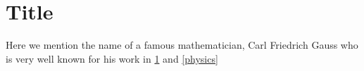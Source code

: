 \documentclass[11pt]{book}
\begin{document}
\tableofcontents
\chapter{Title}
\label{Title}
\label{physics}
Here we mention the name of a famous mathematician, Carl Friedrich 
Gauss who is very well known
for his work in \ref{Title}\index[nominum]{\ref{Title}} and 
\ref{physics}\index[rerum]{\ref{physics}}

\printindex[rerum]
\printindex[nominum]
\end{document}
